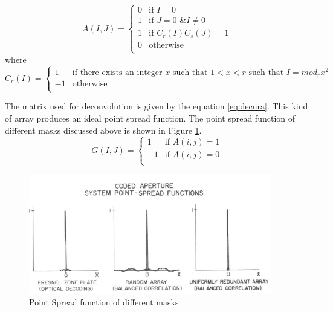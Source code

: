 \begin{equation}
  A(I,J) =
  \begin{cases}
    0 & \text{if $I = 0$} \\
    1 & \text{if $J = 0$ \& $I\neq 0$} \\
    1 & \text{if $C_r(I)C_s(J) = 1$} \\
    0 & \text{otherwise}\\
  \end{cases}
  \label{eq:ura}
\end{equation}
where
\begin{equation}
  C_r(I) =
  \begin{cases}
    1 & \text{if there exists an integer $x$ such that 
    $1<x<r$ 
    such that $I = mod_rx^2$    
    } \\
    -1 & \text{otherwise} \\
  \end{cases}
  \label{eq:ura}
\end{equation}

The matrix used for deconvolution is given by the equation \ref{eq:decura}. This kind of array produces an ideal point spread function. The point spread function of different masks discussed above is shown in Figure \ref{fig:psf_old_mask}.
\begin{equation}
  G(I,J) =
  \begin{cases}
    1 & \text{if $A(i,j) = 1$} \\
    -1 & \text{if $A(i,j) = 0$} \\
  \end{cases}
  \label{eq:decura}
\end{equation}

\begin{figure}[ht]
\includegraphics[width=\textwidth]{pics/psf_mask}
\caption{Point Spread function of different masks\cite{Fenimore:78}}
\label{fig:psf_old_mask}
\end{figure}


